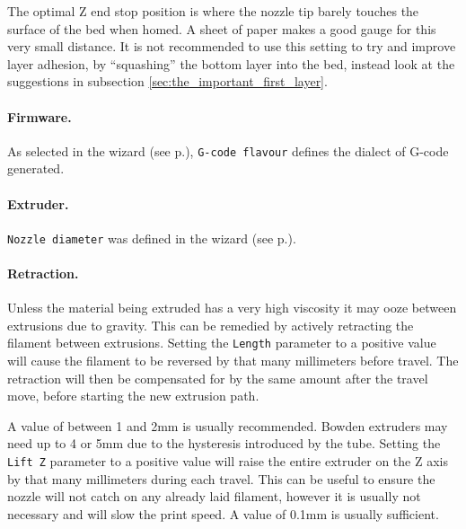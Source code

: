 The optimal Z end stop position is where the nozzle tip barely touches the surface of the bed when homed.  A sheet of paper makes a good gauge for this very small distance.  It is not recommended to use this setting to try and improve layer adhesion, by ``squashing'' the bottom layer into the bed, instead look at the suggestions in subsection \ref{sec:the_important_first_layer}.

\paragraph{Firmware.} %
\label{par:firmware}
As selected in the wizard (see p.\pageref{sub:1_firmware_type}), \texttt{G-code flavour} defines the dialect of G-code generated.


\paragraph{Extruder.} %
\label{par:extruder}
\texttt{Nozzle diameter} was defined in the wizard (see p.\pageref{sub:3_nozzle_diameter}).

\paragraph{Retraction.} %
\label{par:retraction}
Unless the material being extruded has a very high viscosity it may ooze between extrusions due to gravity.  This can be remedied by actively retracting the filament between extrusions.  Setting the \texttt{Length} parameter to a positive value will cause the filament to be reversed by that many millimeters before travel.  The retraction will then be compensated for by the same amount after the travel move, before starting the new extrusion path.

A value of between 1 and 2mm is usually recommended. Bowden extruders may need up to 4 or 5mm due to the hysteresis introduced by the tube.
Setting the \texttt{Lift Z} parameter to a positive value will raise the entire extruder on the Z axis by that many millimeters during each travel.  This can be useful to ensure the nozzle will not catch on any already laid filament, however it is usually not necessary and will slow the print speed.  A value of 0.1mm is usually sufficient.

